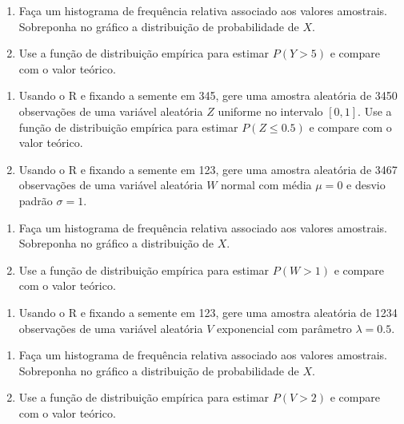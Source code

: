 \documentclass[
]{book}
\providecommand{\tightlist}{%
  \setlength{\itemsep}{0pt}\setlength{\parskip}{0pt}}
\begin{document}
\begin{enumerate}
\def\labelenumi{(\alph{enumi})}
\item
  Faça um histograma de frequência relativa associado aos valores amostrais. Sobreponha no gráfico a distribuição de probabilidade de \(X\).
\item
  Use a função de distribuição empírica para estimar \(P(Y > 5)\) e compare com o valor teórico.
\end{enumerate}

\begin{enumerate}
\def\labelenumi{\arabic{enumi}.}
\setcounter{enumi}{6}
\item
  Usando o R e fixando a semente em 345, gere uma amostra aleatória de 3450 observações de uma variável aleatória \(Z\) uniforme no intervalo \([0, 1]\). Use a função de distribuição empírica para estimar \(P(Z \leq 0.5)\) e compare com o valor teórico.
\item
  Usando o R e fixando a semente em 123, gere uma amostra aleatória de 3467 observações de uma variável aleatória \(W\) normal com média \(\mu = 0\) e desvio padrão \(\sigma = 1\).
\end{enumerate}

\begin{enumerate}
\def\labelenumi{(\alph{enumi})}
\item
  Faça um histograma de frequência relativa associado aos valores amostrais. Sobreponha no gráfico a distribuição de \(X\).
\item
  Use a função de distribuição empírica para estimar \(P(W > 1)\) e compare com o valor teórico.
\end{enumerate}

\begin{enumerate}
\def\labelenumi{\arabic{enumi}.}
\setcounter{enumi}{8}
\tightlist
\item
  Usando o R e fixando a semente em 123, gere uma amostra aleatória de 1234 observações de uma variável aleatória \(V\) exponencial com parâmetro \(\lambda = 0.5\).
\end{enumerate}

\begin{enumerate}
\def\labelenumi{(\alph{enumi})}
\item
  Faça um histograma de frequência relativa associado aos valores amostrais. Sobreponha no gráfico a distribuição de probabilidade de \(X\).
\item
  Use a função de distribuição empírica para estimar \(P(V > 2)\) e compare com o valor teórico.
\end{enumerate}
\end{document}
